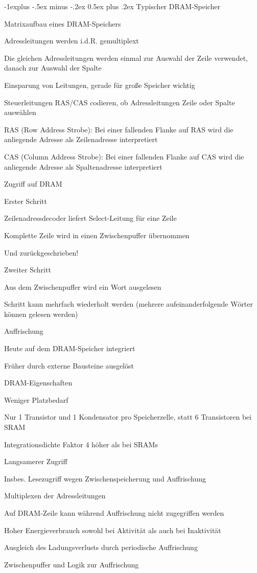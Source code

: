 \documentclass[10pt,landscape]{article}
\makeatletter
\renewcommand{\subsection}{\@startsection{subsection}{2}{0mm}%
                                {-1explus -.5ex minus -.2ex}%
                                {0.5ex plus .2ex}%
                                {\normalfont\normalsize\bfseries}}
\makeatother
\begin{document}
\begin{multicols}{3}
  \subsection{ Typischer DRAM-Speicher}
  \begin{itemize*}
    \item Matrixaufbau eines DRAM-Speichers
    \item Adressleitungen werden i.d.R. gemultiplext
    \item Die gleichen Adressleitungen werden einmal zur Auswahl der Zeile verwendet, danach zur Auswahl der Spalte
    \item Einsparung von Leitungen, gerade für große Speicher wichtig
    \item Steuerleitungen RAS/CAS codieren, ob Adressleitungen Zeile oder Spalte auswählen
    \item RAS (Row Address Strobe): Bei einer fallenden Flanke auf RAS wird die anliegende Adresse als Zeilenadresse interpretiert
    \item CAS (Column Address Strobe): Bei einer fallenden Flanke auf CAS wird die anliegende Adresse als Spaltenadresse interpretiert
    \item Zugriff auf DRAM
    \item Erster Schritt
    \item Zeilenadressdecoder liefert Select-Leitung für eine Zeile
    \item Komplette Zeile wird in einen Zwischenpuffer übernommen
    \item Und zurückgeschrieben!
    \item Zweiter Schritt
    \item Aus dem Zwischenpuffer wird ein Wort ausgelesen
    \item Schritt kann mehrfach wiederholt werden (mehrere aufeinanderfolgende Wörter können gelesen werden)
    \item Auffrischung
    \item Heute auf dem DRAM-Speicher integriert
    \item Früher durch externe Bausteine ausgelöst
    \item DRAM-Eigenschaften
    \item Weniger Platzbedarf
    \item Nur 1 Transistor und 1 Kondensator pro Speicherzelle, statt 6 Transistoren bei SRAM
    \item Integrationsdichte Faktor 4 höher als bei SRAMs
    \item Langsamerer Zugriff
    \item Insbes. Lesezugriff wegen Zwischenspeicherung und Auffrischung
    \item Multiplexen der Adressleitungen
    \item Auf DRAM-Zeile kann während Auffrischung nicht zugegriffen werden
    \item Hoher Energieverbrauch sowohl bei Aktivität als auch bei Inaktivität
    \item Ausgleich des Ladungsverlusts durch periodische Auffrischung
    \item Zwischenpuffer und Logik zur Auffrischung
  \end{itemize*}
  

\end{multicols}
\end{document}
